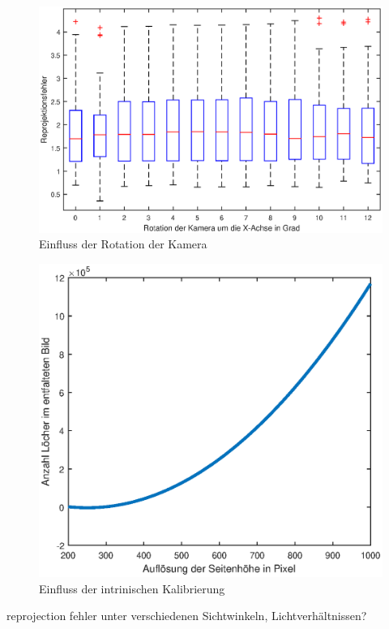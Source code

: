 \begin{figure}[!htb]
	\centering
	\includegraphics[width=\textwidth]{images/reprojectionErrorDeg.eps}
	\caption{Einfluss der Rotation der Kamera}
	\label{fig:influenceRot}
\end{figure}

\begin{figure}[!htb]
	\centering
	\includegraphics[width=\textwidth]{images/numberOfHoles.eps}
	\caption{Einfluss der intrinischen Kalibrierung}
	\label{fig:influenceRes}
\end{figure}


reprojection fehler unter verschiedenen Sichtwinkeln, Lichtverhältnissen?



